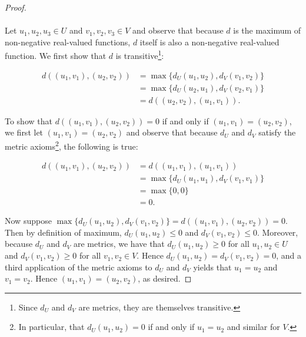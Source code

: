     \begin{proof}\ \\\\
        Let $u_1, u_2, u_3 \in U$ and $v_1, v_2, v_3 \in V$ and observe that because $d$ is the maximum of non-negative
        real-valued functions, $d$ itself is also a non-negative real-valued function. We first show that $d$ is 
        transitive\footnote{
            Since $d_U$ and $d_V$ are metrics, they are themselves transitive.
        }:

        \begin{align*}
            d((u_1, v_1), (u_2, v_2)) &= \max{\{d_U(u_1, u_2), d_V(v_1, v_2)\}} \\
                                      &= \max{\{d_U(u_2, u_1), d_V(v_2, v_1)\}} \\
                                      &= d((u_2, v_2), (u_1, v_1)).
        \end{align*}

        To show that $d((u_1, v_1), (u_2, v_2)) = 0$ if and only if $(u_1, v_1) = (u_2, v_2)$, we first let
        $(u_1, v_1) = (u_2, v_2)$ and observe that because $d_U$ and $d_V$ satisfy the metric axioms\footnote{
            In particular, that $d_U(u_1, u_2) = 0$ if and only if $u_1 = u_2$ and similar for $V$.
        }, the following
        is true:
        
        \begin{align*}
            d((u_1, v_1), (u_2, v_2)) &= d((u_1, v_1), (u_1, v_1)) \\
                                      &= \max{\{d_U(u_1, u_1), d_V(v_1, v_1)\}} \\
                                      &= \max{\{0, 0\}} \\
                                      &= 0.
        \end{align*}

        Now suppose $\max{\{d_U(u_1, u_2), d_V(v_1, v_2)\}} = d((u_1, v_1), (u_2, v_2)) = 0$. Then by definition of
        maximum, $ d_U(u_1, u_2) \le 0$ and $d_V(v_1, v_2) \le 0$. Moreover, because $d_U$ and $d_V$ are metrics, we
        have that $d_U(u_1, u_2) \ge 0$ for all $u_1, u_2 \in U$ and $d_V(v_1, v_2) \ge 0$ for all $v_1, v_2 \in V$.
        Hence $d_U(u_1, u_2) = d_V(v_1, v_2) = 0$, and a third application of the metric axioms to $d_U$ and $d_V$
        yields that $u_1 = u_2$ and $v_1 = v_2$. Hence $(u_1, v_1) = (u_2, v_2)$, as desired.


\end{proof}
